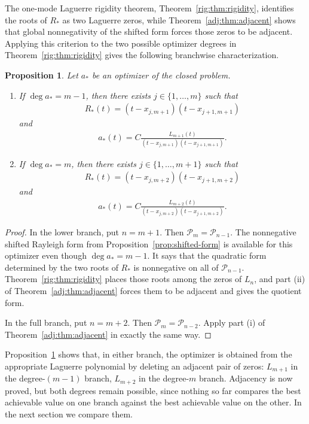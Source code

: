 \documentclass[11pt]{article}
\numberwithin{equation}{section}
\newtheorem{proposition}[theorem]{Proposition}
\theoremstyle{definition}
\theoremstyle{remark}
\newcommand{\Pcal}{\mathcal P}
\newcommand{\Lag}{L}
\begin{document}
The one-mode Laguerre rigidity theorem, Theorem~\ref{rig:thm:rigidity}, identifies the roots of $R_*$
 as two Laguerre zeros, while Theorem~\ref{adj:thm:adjacent} shows that global nonnegativity of the shifted form forces those zeros to be adjacent. Applying this criterion to the two possible optimizer degrees in Theorem~\ref{rig:thm:rigidity} gives the following branchwise characterization.

\begin{proposition}\label{adj:prop:adjacency-branches}
Let $a_*$ be an optimizer of the closed problem.
\begin{enumerate}[label=\textup{(\roman*)}]
\item If $\deg a_*=m-1$, then there exists $j\in\{1,\ldots,m\}$ such that
\begin{align*}
 R_*(t)=(t-x_{j,m+1})(t-x_{j+1,m+1})
\end{align*}
and
\begin{align*}
 a_*(t)=C\frac{\Lag_{m+1}(t)}
 {(t-x_{j,m+1})(t-x_{j+1,m+1})}.
\end{align*}
\item If $\deg a_*=m$, then there exists $j\in\{1,\ldots,m+1\}$ such that
\begin{align*}
 R_*(t)=(t-x_{j,m+2})(t-x_{j+1,m+2})
\end{align*}
and
\begin{align*}
 a_*(t)=C\frac{\Lag_{m+2}(t)}
 {(t-x_{j,m+2})(t-x_{j+1,m+2})}.
\end{align*}
\end{enumerate}
\end{proposition}

\begin{proof}

In the lower branch, put $n=m+1$. Then $\Pcal_m=\Pcal_{n-1}$. The
nonnegative shifted Rayleigh form from Proposition~\ref{prop:shifted-form} is
available for this optimizer even though $\deg a_*=m-1$. It says that the
quadratic form determined by the two roots of $R_*$ is nonnegative on all of
$\Pcal_{n-1}$. Theorem~\ref{rig:thm:rigidity} places those roots among the
zeros of $\Lag_n$, and part (ii) of Theorem~\ref{adj:thm:adjacent} forces them
to be adjacent and gives the quotient form.


In the full branch, put $n=m+2$. Then $\Pcal_m=\Pcal_{n-2}$. Apply part (i) of Theorem~\ref{adj:thm:adjacent} in exactly the same way.
\end{proof}

Proposition~\ref{adj:prop:adjacency-branches} shows that, in either branch, the optimizer is obtained from the appropriate Laguerre polynomial by deleting an adjacent pair of zeros: $\Lag_{m+1}$ in the degree-$(m-1)$ branch, $\Lag_{m+2}$ in the degree-$m$ branch. Adjacency is now proved, but both degrees remain possible, since nothing so far compares the best achievable value on one branch against the best achievable value on the other. In the next section we compare them. 
\end{document}
